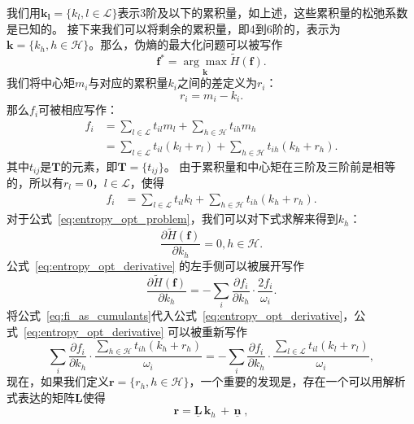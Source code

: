 我们用$\bm{k_l}=\{k_l, l\!\in\!\mathcal{L}\}$表示3阶及以下的累积量，如上述，这些累积量的松弛系数是已知的。
接下来我们可以将剩余的累积量，即4到6阶的，表示为$\bm{k}=\{k_h, h\!\in\!\mathcal{H}\}$。那么，伪熵的最大化问题可以被写作
\begin{equation}
    \label{eq:entropy_opt_problem}
    \bm{f}^{*} = \underset{\bm{k}}{\arg \max } \tilde{H}(\bm{f}).
\end{equation}
我们将中心矩$m_i$与对应的累积量$k_i$之间的差定义为$r_i$：
\begin{equation}
    r_i = m_i - k_i.
\end{equation}
那么$f_i$可被相应写作：
\begin{align}
    f_i &= \sum_{l \in \mathcal{L}} t_{il}m_l+\sum_{h \in \mathcal{H}} t_{ih}m_h \\
    &= \sum_{l \in \mathcal{L}} t_{il}(k_l + r_l)+\sum_{h \in \mathcal{H}} t_{ih}(k_h + r_h).
\end{align}
其中$t_{ij}$是$\bm{T}$的元素，即$\bm{T}=\{t_{ij}\}$。
由于累积量和中心矩在三阶及三阶前是相等的，所以有$r_l = 0，l \!\in\! \mathcal{L}$，使得
\begin{align}
    f_i &= \sum_{l \in \mathcal{L}} t_{il}k_l + \sum_{h \in \mathcal{H}} t_{ih}(k_h + r_h). \label{eq:fi_as_cumulants}
\end{align}
对于公式~\ref{eq:entropy_opt_problem}，我们可以对下式求解来得到$k_h$：
\begin{equation}
    \label{eq:entropy_opt_derivative}
    \frac{\partial \tilde{H}(\bm{f})}{\partial k_h} = 0, h \in \mathcal{H}.
\end{equation}
公式~\ref{eq:entropy_opt_derivative} 的左手侧可以被展开写作
\begin{equation}
    \frac{\partial \tilde{H}(\bm{f})}{\partial k_h} = -\sum_i \frac{\partial f_i}{\partial k_h} \cdot \frac{2 f_i}{\omega_i}.
\end{equation}
将公式~\ref{eq:fi_as_cumulants}代入公式~\ref{eq:entropy_opt_derivative}，公式~\ref{eq:entropy_opt_derivative} 可以被重新写作
\begin{equation}
    \label{eq:entropy_opt_expanded}
    \sum_i \frac{\partial f_i}{\partial k_h} \cdot \frac{\sum_{h \in \mathcal{H}} t_{ih}(k_h + r_h)}{\omega_i} = -\sum_i \frac{\partial f_i}{\partial k_h} \cdot \frac{\sum_{l \in \mathcal{L}} t_{il}(k_l + r_l)}{\omega_i},
\end{equation}
现在，如果我们定义$\bm{r} = \{r_h, h \!\in\! \mathcal{H}\}$，一个重要的发现是，存在一个可以用解析式表达的矩阵$\bm{\underline{L}}$使得
\begin{equation}
    \bm{r} = \bm{\underline{L}} \,\bm{k}_h \,+\,  \bm{\underline{n}}\;, \label{linearRelationKvsM}
\end{equation}
